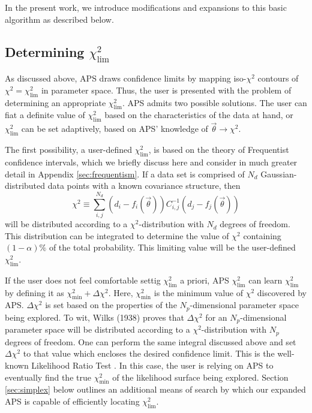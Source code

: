 \documentclass[useAMS,usenatbib]{aastex}
\begin{document}
In the present work, we introduce modifications and expansions to this basic algorithm as
described below.

\subsection{Determining $\chi^2_\text{lim}$}
\label{sec:chi}

As discussed above, APS draws confidence limits by mapping
iso-$\chi^2$ contours of $\chi^2=\chi^2_\text{lim}$ in parameter space.
Thus, the user is presented with the problem of determining an
appropriate $\chi^2_\text{lim}$.  APS admits two possible solutions.
The user can fiat a definite value of $\chi^2_\text{lim}$
based on the characteristics of the data at hand,
or $\chi^2_\text{lim}$ can be set adaptively, based on APS'
knowledge of $\vec{\theta}\rightarrow\chi^2$.

The first possibility, a user-defined $\chi^2_\text{lim}$, is based
on the theory of Frequentist confidence intervals, which we briefly discuss
here and consider in much greater detail in Appendix \ref{sec:frequentism}.
If a data set is comprised of $N_d$ Gaussian-distributed data points
with a known covariance structure, then 
\begin{equation}
\chi^2\equiv\sum_{i,j}^{N_d}(d_i-f_i(\vec{\theta}))C^{-1}_{i,j}
(d_j-f_j(\vec{\theta}))
\end{equation}
will be distributed according to a $\chi^2$-distribution with $N_d$ degrees
of freedom.  This distribution can be integrated to determine the value
of $\chi^2$ containing $(1-\alpha)\%$ of the total probability.  This limiting
value will be the user-defined $\chi^2_\text{lim}$.

If the user does not feel comfortable settig $\chi^2_\text{lim}$
a priori, APS $\chi^2_\text{lim}$ can learn $\chi^2_\text{lim}$ by
defining it as $\chi^2_\text{min}+\Delta\chi^2$.  Here, $\chi^2_\text{min}$
is the minimum value of $\chi^2$ discovered by APS.  
$\Delta \chi^2$ is set
based on the properties of the $N_p$-dimensional parameter space being explored.
To wit, Wilks (1938) proves that $\Delta\chi^2$ for an $N_p$-dimensional
parameter space will be distributed according to a $\chi^2$-distribution
with $N_p$ degrees of freedom.  One can perform the same integral discussed
above and set $\Delta\chi^2$ to that value which encloses the desired confidence
limit.  This is the well-known Likelihood Ratio Test \cite{np}.
In this case, the user is relying on APS to eventually find the true
$\chi^2_\text{min}$ of the likelihood surface being explored.  
Section \ref{sec:simplex} below outlines an additional means of search
by which our expanded APS is capable of efficiently locating $\chi^2_\text{lim}$.
\end{document}
